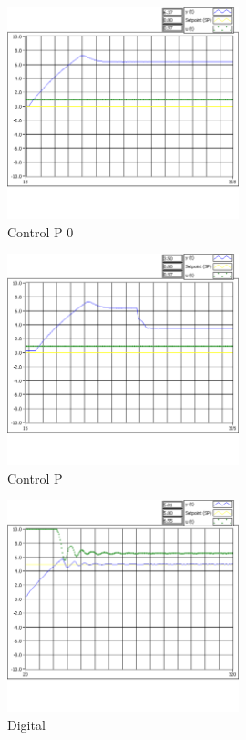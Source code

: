 \documentclass[]{article}
\begin{document}




\begin{figure}[h!]
	\centering
	\includegraphics[width=0.6\textwidth]{Imagenes/ControlP_0.png}
	\caption{Control P 0}
	\label{fig:ControlP0}
\end{figure}

\begin{figure}[h!]
	\centering
	\includegraphics[width=0.6\textwidth]{Imagenes/ControlP.png}
	\caption{Control P}
	\label{fig:ControlP}
\end{figure}


\begin{figure}[h!]
	\centering
	\includegraphics[width=0.6\textwidth]{Imagenes/DigitalA.png}
	\caption{Digital}
	\label{fig:DigitalA}
\end{figure}
\end{document}
